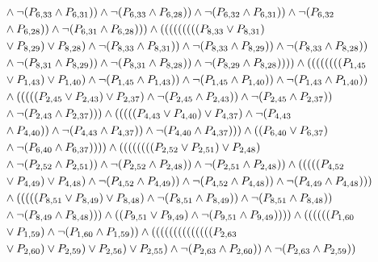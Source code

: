 \documentclass[10pt]{article}
\begin{document}
\begin{align*}
& \land \lnot(\PV{6,33} \land \PV{6,31})) \land \lnot(\PV{6,33} \land \PV{6,28})) \land \lnot(\PV{6,32} \land \PV{6,31})) \land \lnot(\PV{6,32} \\
& \land \PV{6,28})) \land \lnot(\PV{6,31} \land \PV{6,28}))) \land (((((((((\PV{8,33} \lor \PV{8,31}) \\
& \lor \PV{8,29}) \lor \PV{8,28}) \land \lnot(\PV{8,33} \land \PV{8,31})) \land \lnot(\PV{8,33} \land \PV{8,29})) \land \lnot(\PV{8,33} \land \PV{8,28})) \\
& \land \lnot(\PV{8,31} \land \PV{8,29})) \land \lnot(\PV{8,31} \land \PV{8,28})) \land \lnot(\PV{8,29} \land \PV{8,28})))) \land ((((((((\PV{1,45} \\
& \lor \PV{1,43}) \lor \PV{1,40}) \land \lnot(\PV{1,45} \land \PV{1,43})) \land \lnot(\PV{1,45} \land \PV{1,40})) \land \lnot(\PV{1,43} \land \PV{1,40})) \\
& \land (((((\PV{2,45} \lor \PV{2,43}) \lor \PV{2,37}) \land \lnot(\PV{2,45} \land \PV{2,43})) \land \lnot(\PV{2,45} \land \PV{2,37})) \\
& \land \lnot(\PV{2,43} \land \PV{2,37}))) \land (((((\PV{4,43} \lor \PV{4,40}) \lor \PV{4,37}) \land \lnot(\PV{4,43} \\
& \land \PV{4,40})) \land \lnot(\PV{4,43} \land \PV{4,37})) \land \lnot(\PV{4,40} \land \PV{4,37}))) \land ((\PV{6,40} \lor \PV{6,37}) \\
& \land \lnot(\PV{6,40} \land \PV{6,37})))) \land ((((((((\PV{2,52} \lor \PV{2,51}) \lor \PV{2,48}) \\
& \land \lnot(\PV{2,52} \land \PV{2,51})) \land \lnot(\PV{2,52} \land \PV{2,48})) \land \lnot(\PV{2,51} \land \PV{2,48})) \land (((((\PV{4,52} \\
& \lor \PV{4,49}) \lor \PV{4,48}) \land \lnot(\PV{4,52} \land \PV{4,49})) \land \lnot(\PV{4,52} \land \PV{4,48})) \land \lnot(\PV{4,49} \land \PV{4,48}))) \\
& \land (((((\PV{8,51} \lor \PV{8,49}) \lor \PV{8,48}) \land \lnot(\PV{8,51} \land \PV{8,49})) \land \lnot(\PV{8,51} \land \PV{8,48})) \\
& \land \lnot(\PV{8,49} \land \PV{8,48}))) \land ((\PV{9,51} \lor \PV{9,49}) \land \lnot(\PV{9,51} \land \PV{9,49})))) \land ((((((\PV{1,60} \\
& \lor \PV{1,59}) \land \lnot(\PV{1,60} \land \PV{1,59})) \land ((((((((((((((\PV{2,63} \\
& \lor \PV{2,60}) \lor \PV{2,59}) \lor \PV{2,56}) \lor \PV{2,55}) \land \lnot(\PV{2,63} \land \PV{2,60})) \land \lnot(\PV{2,63} \land \PV{2,59})) \\

\end{align*}
\end{document}
